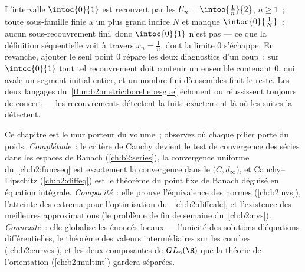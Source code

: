 \begin{example}\label{ex:b2:metric:covers}
L'intervalle  $\intoc{0}{1}$ est recouvert par les 
$U_n = \intoo{\frac1n}{2}$, $n \geq 1$~; toute sous-famille finie a
un plus grand indice $N$ et manque $\intoc{0}{\frac1N}$~: aucun
sous-recouvrement fini, donc $\intoc{0}{1}$ n'est pas  --- ce
que la définition séquentielle voit à travers $x_n = \frac1n$, dont
la limite $0$ s'échappe. En revanche, ajouter le seul point $0$
répare les deux diagnostics d'un coup~: sur $\intcc{0}{1}$ tout tel
recouvrement doit contenir un ensemble contenant $0$, qui avale un
segment initial entier, et un nombre fini d'ensembles finit le reste.
Les deux langages du~\cref{thm:b2:metric:borellebesgue} échouent ou
réussissent toujours de concert --- les recouvrements détectent la
fuite exactement là où les suites la détectent.
\end{example}

\begin{remark}\label{rem:b2:metric:perspectives}
Ce chapitre est le mur porteur du volume~; observez où chaque pilier
porte du poids. \emph{Complétude}~: le critère de Cauchy devient le
test de convergence des séries dans les espaces de Banach
(\cref{ch:b2:series}), la convergence uniforme du~\cref{ch:b2:funcseq}
est exactement la convergence dans le  $\bigl(C,
d_\infty\bigr)$, et Cauchy--Lipschitz (\cref{ch:b2:diffeq}) est le
théorème du point fixe de Banach déguisé en équation intégrale.
\emph{Compacité}~: elle prouve l'équivalence des normes
(\cref{ch:b2:nvs}), l'atteinte des extrema pour l'optimisation du~%
\cref{ch:b2:diffcalc}, et l'existence des meilleures approximations
(le problème de fin de semaine du~\cref{ch:b2:nvs}). \emph{Connexité}~:
elle globalise les énoncés locaux --- l'unicité des solutions
d'équations différentielles, le théorème des valeurs intermédiaires
sur les courbes (\cref{ch:b2:curves}), et les deux composantes de
$GL_n(\R)$ que la théorie de l'orientation (\cref{ch:b2:multint})
gardera séparées.
\end{remark}

